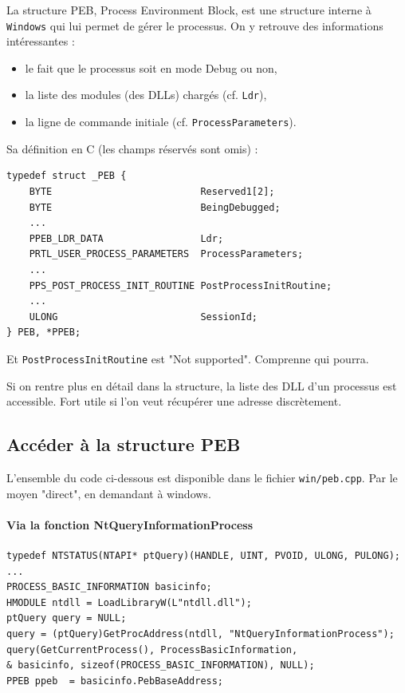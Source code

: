 \documentclass{book}
\newcommand{\code}[1]{\texttt{#1}}
\newcommand{\Windows}{{\sc windows}}
\begin{document}
La structure PEB, Process Environment Block, est une structure interne à \code{Windows} qui lui permet de gérer le processus. On y retrouve des informations intéressantes : 
\begin{itemize}
	\item le fait que le processus soit en mode Debug ou non, 
	\item la liste des modules (des DLLs) chargés (cf. \code{Ldr}),
	\item la ligne de commande initiale (cf. \code{ProcessParameters}).
\end{itemize}

Sa définition en C (les champs réservés sont omis) : 
\begin{verbatim}
typedef struct _PEB {
	BYTE                          Reserved1[2];
	BYTE                          BeingDebugged;
	...
	PPEB_LDR_DATA                 Ldr;
	PRTL_USER_PROCESS_PARAMETERS  ProcessParameters;
	...
	PPS_POST_PROCESS_INIT_ROUTINE PostProcessInitRoutine;
	...
	ULONG                         SessionId;
} PEB, *PPEB;
\end{verbatim}

Et \code{PostProcessInitRoutine} est "Not supported". Comprenne qui pourra. 

Si on rentre plus en détail dans la structure, la liste des DLL d'un processus est accessible. Fort utile si l'on veut récupérer une adresse discrètement.  

\subsection{Accéder à la structure PEB}

L'ensemble du code ci-dessous est disponible dans le fichier \code{win/peb.cpp}. Par le moyen "direct", en demandant à \Windows. 

\paragraph{Via la fonction NtQueryInformationProcess}

\begin{verbatim}
typedef NTSTATUS(NTAPI* ptQuery)(HANDLE, UINT, PVOID, ULONG, PULONG);
...
PROCESS_BASIC_INFORMATION basicinfo;
HMODULE ntdll = LoadLibraryW(L"ntdll.dll");
ptQuery query = NULL;
query = (ptQuery)GetProcAddress(ntdll, "NtQueryInformationProcess");
query(GetCurrentProcess(), ProcessBasicInformation, 
& basicinfo, sizeof(PROCESS_BASIC_INFORMATION), NULL);
PPEB ppeb  = basicinfo.PebBaseAddress;
\end{verbatim}
\end{document}
